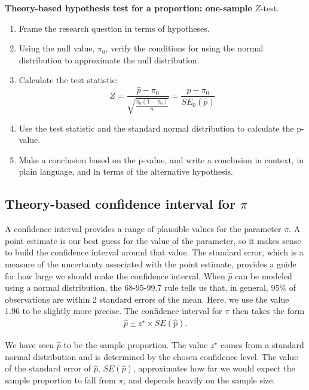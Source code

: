 \documentclass[
  10pt,
  openany]{book}
\providecommand{\tightlist}{%
  \setlength{\itemsep}{0pt}\setlength{\parskip}{0pt}}
\theoremstyle{definition}
\theoremstyle{definition}
\theoremstyle{definition}
\theoremstyle{definition}
\theoremstyle{remark}
\begin{document}
\textbf{Theory-based hypothesis test for a proportion: one-sample} \(Z\)-test.

\begin{enumerate}
\def\labelenumi{\arabic{enumi}.}
\tightlist
\item
  Frame the research question in terms of hypotheses.
\item
  Using the null value, \(\pi_0\), verify the conditions for using the normal distribution to approximate the null distribution.
\item
  Calculate the test statistic: \[
   Z = \frac{\hat{p} - \pi_0}{\sqrt{\frac{\pi_0(1-\pi_0)}{n}}} = \frac{\hat{p} - \pi_0}{SE_0(\hat{p})}
   \]
\item
  Use the test statistic and the standard normal distribution to calculate the p-value.
\item
  Make a conclusion based on the p-value, and write a conclusion in context, in plain language, and in terms of the alternative hypothesis.
\end{enumerate}

\subsection{\texorpdfstring{Theory-based confidence interval for \(\pi\)}{Theory-based confidence interval for \textbackslash pi}}\label{theory-based-confidence-interval-for-pi}

A confidence interval provides a range of plausible values for the parameter \(\pi\). A point estimate is our best guess for the value of the parameter, so it makes sense to build the confidence interval around that value. The standard error, which is a measure of the uncertainty associated with the point estimate, provides a guide for how large we should make the confidence interval. When \(\hat{p}\) can be modeled using a normal distribution, the 68-95-99.7 rule tells us that, in general, 95\% of observations are within 2 standard errors of the mean. Here, we use the value 1.96 to be slightly more precise. The confidence interval for \(\pi\) then takes the form \begin{align*}
\hat{p} \pm z^{\star} \times SE(\hat{p}).
\end{align*}

We have seen \(\hat{p}\) to be the sample proportion. The value \(z^{\star}\) comes from a standard normal distribution and is determined by the chosen confidence level. The value of the standard error of \(\hat{p}\), \(SE(\hat{p})\), approximates how far we would expect the sample proportion to fall from \(\pi\), and depends heavily on the sample size.
\end{document}
